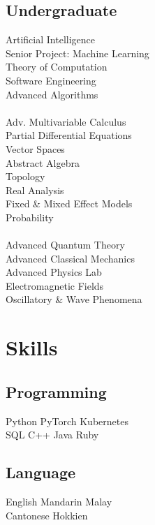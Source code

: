 \documentclass{deedy-resume-openfont}
\begin{document}
\begin{minipage}[t]{0.33\textwidth}
\subsection{Undergraduate}
Artificial Intelligence \\
Senior Project: Machine Learning \\
Theory of Computation \\
Software Engineering \\
Advanced Algorithms \\
\ \\
Adv. Multivariable Calculus \\
Partial Differential Equations \\
Vector Spaces \\
Abstract Algebra \\
Topology \\
Real Analysis \\
Fixed \& Mixed Effect Models \\
Probability \\
\ \\
Advanced Quantum Theory \\
Advanced Classical Mechanics \\
Advanced Physics Lab \\
Electromagnetic Fields \\
Oscillatory \& Wave Phenomena \\

\sectionsep


\section{Skills}
\subsection{Programming}
Python \textbullet{} PyTorch \textbullet{} Kubernetes \\

SQL \textbullet{} C++ \textbullet{} Java \textbullet{} Ruby \\
\sectionsep

\subsection{Language}
English \textbullet{} Mandarin \textbullet{} Malay \\
Cantonese \textbullet{} Hokkien
\sectionsep

%
%

\end{minipage}
\end{document}
